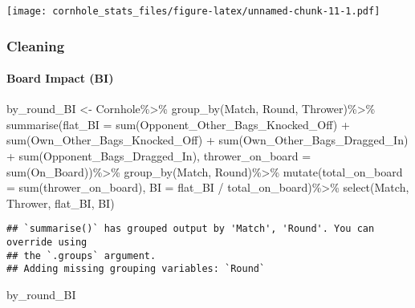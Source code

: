 \documentclass[
]{article}
\newenvironment{Shaded}{\begin{snugshade}}{\end{snugshade}}
\newcommand{\AttributeTok}[1]{\textcolor[rgb]{0.77,0.63,0.00}{#1}}
\newcommand{\FunctionTok}[1]{\textcolor[rgb]{0.00,0.00,0.00}{#1}}
\newcommand{\NormalTok}[1]{#1}
\newcommand{\OtherTok}[1]{\textcolor[rgb]{0.56,0.35,0.01}{#1}}
\newcommand{\SpecialCharTok}[1]{\textcolor[rgb]{0.00,0.00,0.00}{#1}}
\begin{document}
\texttt{[image: cornhole\_stats\_files/figure-latex/unnamed-chunk-11-1.pdf]}

\hypertarget{cleaning}{%
\subsubsection{Cleaning}\label{cleaning}}

\hypertarget{board-impact-bi}{%
\paragraph{Board Impact (BI)}\label{board-impact-bi}}

\begin{Shaded}
\begin{Highlighting}[]
\NormalTok{by\_round\_BI }\OtherTok{\textless{}{-}}\NormalTok{ Cornhole}\SpecialCharTok{\%\textgreater{}\%}
  \FunctionTok{group\_by}\NormalTok{(Match, Round, Thrower)}\SpecialCharTok{\%\textgreater{}\%}
  \FunctionTok{summarise}\NormalTok{(}\AttributeTok{flat\_BI =} \FunctionTok{sum}\NormalTok{(Opponent\_Other\_Bags\_Knocked\_Off) }\SpecialCharTok{+} \FunctionTok{sum}\NormalTok{(Own\_Other\_Bags\_Knocked\_Off) }\SpecialCharTok{+} \FunctionTok{sum}\NormalTok{(Own\_Other\_Bags\_Dragged\_In) }\SpecialCharTok{+} \FunctionTok{sum}\NormalTok{(Opponent\_Bags\_Dragged\_In),}
            \AttributeTok{thrower\_on\_board =} \FunctionTok{sum}\NormalTok{(On\_Board))}\SpecialCharTok{\%\textgreater{}\%}
  \FunctionTok{group\_by}\NormalTok{(Match, Round)}\SpecialCharTok{\%\textgreater{}\%}
  \FunctionTok{mutate}\NormalTok{(}\AttributeTok{total\_on\_board =} \FunctionTok{sum}\NormalTok{(thrower\_on\_board), }
         \AttributeTok{BI =}\NormalTok{ flat\_BI }\SpecialCharTok{/}\NormalTok{ total\_on\_board)}\SpecialCharTok{\%\textgreater{}\%}
  \FunctionTok{select}\NormalTok{(Match, Thrower, flat\_BI, BI)}
\end{Highlighting}
\end{Shaded}

\begin{verbatim}
## `summarise()` has grouped output by 'Match', 'Round'. You can override using
## the `.groups` argument.
## Adding missing grouping variables: `Round`
\end{verbatim}

\begin{Shaded}
\begin{Highlighting}[]
\NormalTok{by\_round\_BI}
\end{Highlighting}
\end{Shaded}
\end{document}
